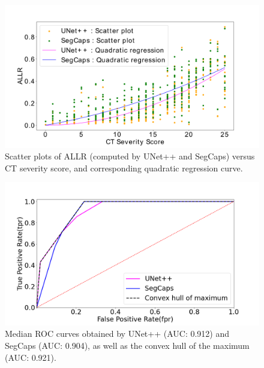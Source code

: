 


\begin{figure}[t!]
    \centering
    \includegraphics[width=\columnwidth]{images/Quadratic-Regression_1.png}
\caption{Scatter plots of ALLR (computed by UNet++ and SegCaps) versus CT severity score, and corresponding quadratic regression curve.}
\label{fig:RelationshipGraph}
\end{figure}

\begin{figure}[t!]
    \centering
    \includegraphics[width=1.0\columnwidth]{images/ROC-Overlay-fpr-tpr.png}
\caption{Median ROC curves obtained by UNet++ (AUC: 0.912) and SegCaps (AUC: 0.904), as well as the convex hull of the maximum (AUC: 0.921).}
\label{fig:ROC_CUrve}
\end{figure}


